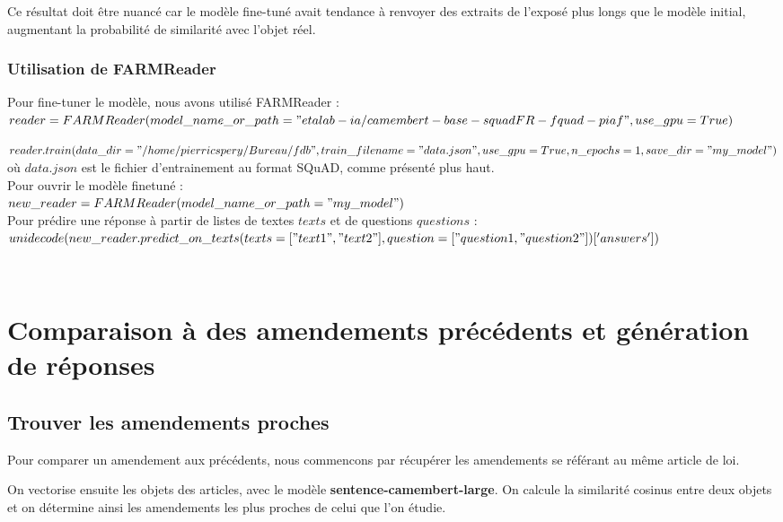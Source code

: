 \documentclass{article}
\begin{document}
Ce résultat doit être nuancé car le modèle fine-tuné avait tendance à renvoyer des extraits de l'exposé plus longs que le modèle initial, augmentant la probabilité de similarité avec l'objet réel.

\subsubsection{Utilisation de FARMReader}

Pour fine-tuner le modèle, nous avons utilisé FARMReader :
\\

$reader = FARMReader(model\_name\_or\_path="etalab-ia/camembert-base-squadFR-fquad-piaf", use\_gpu=True)$

$reader.train(data\_dir="/home/pierricspery/Bureau/fdb", train\_filename="data.json", use\_gpu=True, n\_epochs=1, save\_dir="my\_model")$
\\

où $data.json$ est le fichier d'entrainement au format SQuAD, comme présenté plus haut.
\\

Pour ouvrir le modèle finetuné :
\\

$new\_reader = FARMReader(model\_name\_or\_path="my\_model")$
\\

Pour prédire une réponse à partir de listes de textes $texts$ et de questions $questions$ : 
\\

$unidecode(new\_reader.predict\_on\_texts(texts=["text1","text2"],question =["question1,"question2"])['answers'])$

\\

\section{Comparaison à des amendements précédents et génération de réponses}

\subsection{Trouver les amendements proches}

Pour comparer un amendement aux précédents, nous commencons par récupérer les amendements se référant au même article de loi.

On vectorise ensuite les objets des articles, avec le modèle \textbf{sentence-camembert-large}. On calcule la similarité cosinus entre deux objets et on détermine ainsi les amendements les plus proches de celui que l'on étudie.
\end{document}
